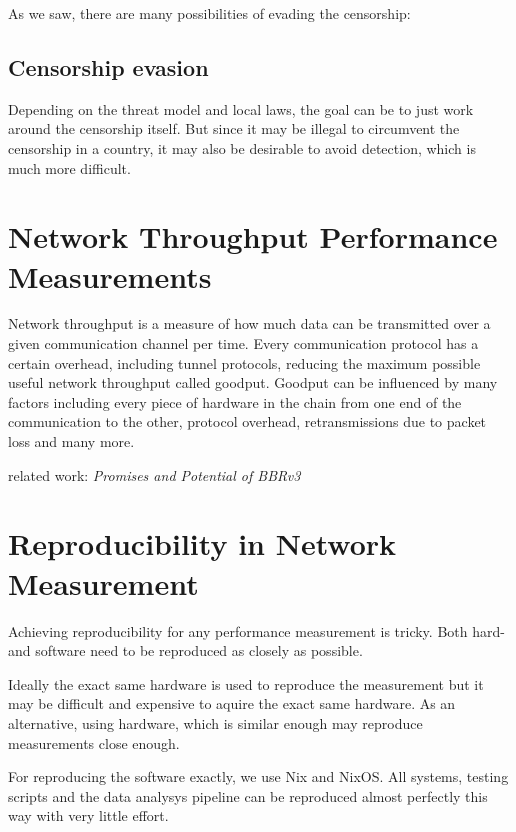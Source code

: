 As we saw, there are many possibilities of evading the censorship:

\subsection{Censorship evasion}
Depending on the threat model and local laws, the goal can be to just work around the censorship itself.
But since it may be illegal to circumvent the censorship in a country, it may also be desirable to avoid detection, which is much more difficult. 

\section{Network Throughput Performance Measurements}
Network throughput is a measure of how much data can be transmitted over a given communication channel per time.
Every communication protocol has a certain overhead, including tunnel protocols, reducing the maximum possible useful network throughput called goodput.
Goodput can be influenced by many factors including every piece of hardware in the chain from one end of the communication to the other, protocol overhead, retransmissions due to packet loss and many more.

related work: \textit{Promises and Potential of BBRv3} \cite{Promises-and-Potential-of-BBRv3}

\section{Reproducibility in Network Measurement}
Achieving reproducibility for any performance measurement is tricky. Both hard- and software need to be reproduced as closely as possible.

Ideally the exact same hardware is used to reproduce the measurement but it may be difficult and expensive to aquire the exact same hardware.
As an alternative, using hardware, which is similar enough may reproduce measurements close enough.

For reproducing the software exactly, we use Nix and NixOS.
All systems, testing scripts and the data analysys pipeline can be reproduced almost perfectly this way with very little effort.

